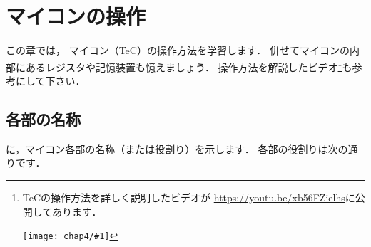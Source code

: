\renewcommand{\myincludegraphics}[2]{\texttt{[image: chap4/\#1]}}

\chapter{マイコンの操作\label{sousa}}

この章では，
マイコン（TeC）の操作方法を学習します．
併せてマイコンの内部にあるレジスタや記憶装置も憶えましょう．
操作方法を解説したビデオ\footnote{
\begin{minipage}[t]{0.9\columnwidth}
\begin{minipage}{0.75\columnwidth}
TeCの操作方法を詳しく説明したビデオが
\url{https://youtu.be/xb56FZielhs}に公開してあります．
\end{minipage}\hfill
\begin{minipage}{0.2\columnwidth}
\myincludegraphics{QR2.png}{scale=0.3}
\end{minipage}
\end{minipage}
}も参考にして下さい．

\section{各部の名称}
に，マイコン各部の名称（または役割り）を示します．
各部の役割りは次の通りです．


